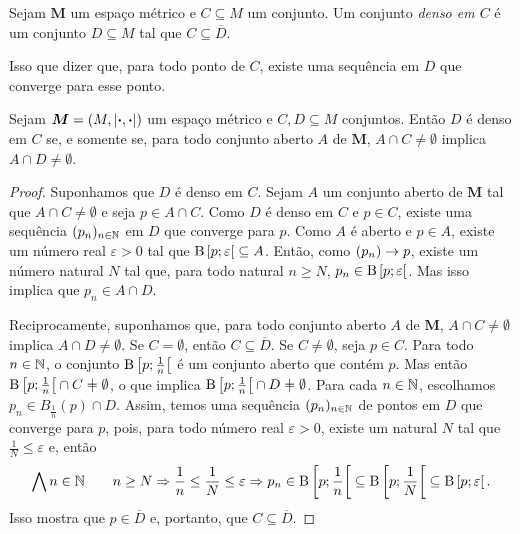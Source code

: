 \begin{definition}
	Sejam $\bm M$ um espaço métrico e $C \subseteq M$ um conjunto. Um conjunto \emph{denso em $C$} é um conjunto $D \subseteq M$ tal que $C \subseteq \overline D$.
\end{definition}

	Isso que dizer que, para todo ponto de $C$, existe uma sequência em $D$ que converge para esse ponto.

\begin{proposition}
	Sejam $\bm M = (M,\left\vert{\bm{\cdot}},{\bm{\cdot}}\right\vert)$ um espaço métrico e $C,D \subseteq M$ conjuntos. Então $D$ é denso em $C$ se, e somente se, para todo conjunto aberto $A$ de $\bm M$, $A \cap C \neq \emptyset$ implica $A \cap D \neq \emptyset$.
\end{proposition}
\begin{proof}
	Suponhamos que $D$ é denso em $C$. Sejam $A$ um conjunto aberto de $\bm M$ tal que $A \cap C \neq \emptyset$ e seja $p \in A \cap C$. Como $D$ é denso em $C$ e $p \in C$, existe uma sequência $(p_n)_{n \in \mathbb{N}}$ em $D$ que converge para $p$. Como $A$ é aberto e $p \in A$, existe um número real $\varepsilon>0$ tal que $\mathrm{B}\left[{p};{\varepsilon}\right[ \subseteq A$. Então, como $(p_n) \rightarrow p$, existe um número natural $N$ tal que, para todo natural $n \geq N$, $p_n \in \mathrm{B}\left[{p};{\varepsilon}\right[$. Mas isso implica que $p_n \in A \cap D$.

	Reciprocamente, suponhamos que, para todo conjunto aberto $A$ de $\bm M$, $A \cap C \neq \emptyset$ implica $A \cap D \neq \emptyset$. Se $C=\emptyset$, então $C \subseteq \overline D$. Se $C \neq \emptyset$, seja $p \in C$. Para todo $n \in \mathbb{N}$, o conjunto $\mathrm{B}\left[{p};{\frac{1}{n}}\right[$ é um conjunto aberto que contém $p$. Mas então $\bola{p}{\frac{1}{n}} \cap C \neq \emptyset$, o que implica $\bola{p}{\frac{1}{n}} \cap D \neq \emptyset$. Para cada $n \in \mathbb{N}$, escolhamos $p_n \in B_\frac{1}{n}(p) \cap D$. Assim, temos uma sequência $(p_n)_{n \in \mathbb{N}}$ de pontos em $D$ que converge para $p$, pois, para todo número real $\varepsilon>0$, existe um natural $N$ tal que $\frac{1}{N} \leq \varepsilon$ e, então
	\begin{equation*}
	\bigwedge\nolimits n \in \mathbb{N} \qquad n \geq N \Rightarrow \frac{1}{n} \leq \frac{1}{N} \leq \varepsilon \Rightarrow p_n \in \mathrm{B}\left[{p};{\frac{1}{n}}\right[ \subseteq \mathrm{B}\left[{p};{\frac{1}{N}}\right[ \subseteq \mathrm{B}\left[{p};{\varepsilon}\right[.
	\end{equation*}
	Isso mostra que $p \in \overline D$ e, portanto, que $C \subseteq \overline D$.
\end{proof}

